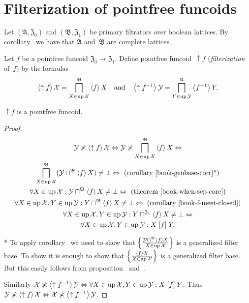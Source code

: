 \chapter{Filterization of pointfree funcoids}

Let $(\mathfrak{A},\mathfrak{Z}_0)$ and $(\mathfrak{B},\mathfrak{Z}_1)$ be primary filtrators over boolean lattices.
By corollary~ we have that $\mathfrak{A}$ and~$\mathfrak{B}$ are complete lattices.

Let $f$ be a pointfree funcoid $\mathfrak{Z}_0\rightarrow\mathfrak{Z}_1$. Define pointfree funcoid~$\uparrow f$ (\emph{filterization} of~$f$)
by the formulas
\[
\left\langle \uparrow f\right\rangle \mathcal{X} = \bigsqcap^{\mathfrak{B}}_{X\in\operatorname{up}\mathcal{X}} \left\langle f\right\rangle X \quad\text{and}\quad
\left\langle \uparrow f^{-1}\right\rangle \mathcal{Y} = \bigsqcap^{\mathfrak{A}}_{Y\in\operatorname{up}\mathcal{Y}} \left\langle f^{-1}\right\rangle Y.
\]

\begin{prop}
$\uparrow f$ is a pointfree funcoid.
\end{prop}

\begin{proof}
~
\begin{multline*}
\mathcal{Y} \nasymp \supfun{\uparrow f} \mathcal{X} \Leftrightarrow
\mathcal{Y} \nasymp \bigsqcap^{\mathfrak{B}}_{X\in\up\mathcal{X}} \supfun{f}X \Leftrightarrow \\
\bigsqcap^{\mathfrak{B}}_{X\in\up\mathcal{X}} (\mathcal{Y} \sqcap^{\mathfrak{B}} \supfun{f}X) \ne \bot \Leftrightarrow \text{ (corollary~\bookref{genbase-corr}*)} \\
\forall X\in\up\mathcal{X}: \mathcal{Y} \sqcap^{\mathfrak{B}} \supfun{f}X \ne \bot \Leftrightarrow \text{ (theorem \bookref{when-sep-core})} \\
\forall X\in\up\mathcal{X}, Y\in\up\mathcal{Y}: Y \sqcap^{\mathfrak{B}} \supfun{f}X \ne \bot \Leftrightarrow \text{ (corollary \bookref{f-meet-closed})} \\
\forall X\in\up\mathcal{X}, Y\in\up\mathcal{Y}: Y \sqcap^{\mathfrak{Z}_1} \supfun{f}X \ne \bot \Leftrightarrow \\
\forall X\in\up\mathcal{X}, Y\in\up\mathcal{Y}: X\suprel{f}Y.
\end{multline*}

* To apply corollary~ we need to show that
$\left\{ \frac{\mathcal{Y} \sqcap^{\mathfrak{B}} \left\langle f\right\rangle X}{X\in\operatorname{up}\mathcal{X}}\right\}$ is a generalized filter base.
To show it is enough to show that $\left\{ \frac{\left\langle f\right\rangle X}{X\in\operatorname{up}\mathcal{X}}\right\}$ is a generalized filter base.
But this easily follows from proposition~ and~.

Similarly $\mathcal{X} \not\asymp \left\langle \uparrow f^{-1}\right\rangle \mathcal{Y} \Leftrightarrow
\forall X\in\operatorname{up}\mathcal{X}, Y\in\operatorname{up}\mathcal{Y}: X\mathrel{\left[f\right]}Y$.
Thus $\mathcal{Y} \not\asymp \left\langle \uparrow f\right\rangle \mathcal{X} \Leftrightarrow \mathcal{X} \not\asymp \left\langle \uparrow f^{-1}\right\rangle \mathcal{Y}$.
\end{proof}

